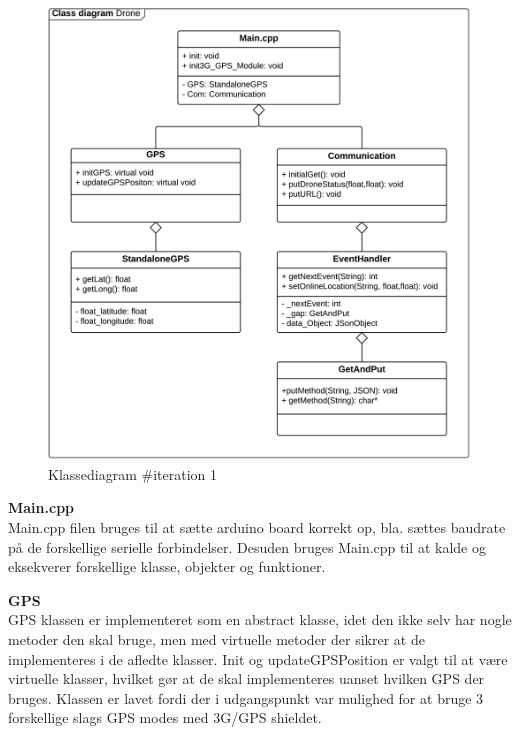 \begin{figure}[H]
	\centering
	\includegraphics[width=1\textwidth]{Billeder/klasse_diagrammer/classdiagram_iteration1.png}
	\vspace{-0.5cm}
	\caption{Klassediagram \#iteration 1}
	\label{fig:classDiagram_iteration1}
\end{figure}


\vspace{0.5cm}


\textbf{Main.cpp} \\
Main.cpp filen bruges til at sætte arduino board korrekt op, bla. sættes baudrate på de forskellige serielle forbindelser. Desuden bruges Main.cpp til at kalde og eksekverer forskellige klasse, objekter og funktioner.

\newpage

\textbf{GPS} \\
GPS klassen er implementeret som en abstract klasse, idet den ikke selv har nogle metoder den skal bruge, men med virtuelle metoder der sikrer at de implementeres i de afledte klasser. 
Init og updateGPSPosition er valgt til at være virtuelle klasser, hvilket gør at de skal implementeres uanset hvilken GPS der bruges. Klassen er lavet fordi der i udgangspunkt var mulighed for at bruge 3 forskellige slags GPS modes med 3G/GPS shieldet. 

